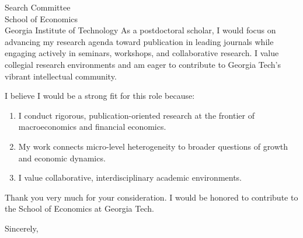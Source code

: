 \documentclass[11pt,letterpaper]{letter}
\begin{document}
\begin{letter}{
Search Committee \\
School of Economics \\
Georgia Institute of Technology
}
As a postdoctoral scholar, I would focus on advancing my research agenda toward publication in leading journals while engaging actively in seminars, workshops, and collaborative research. I value collegial research environments and am eager to contribute to Georgia Tech’s vibrant intellectual community.

I believe I would be a strong fit for this role because:
\begin{enumerate}
    \item I conduct rigorous, publication-oriented research at the frontier of macroeconomics and financial economics.
    \item My work connects micro-level heterogeneity to broader questions of growth and economic dynamics.
    \item I value collaborative, interdisciplinary academic environments.
\end{enumerate}

Thank you very much for your consideration. I would be honored to contribute to the School of Economics at Georgia Tech.

\closing{Sincerely,}

\end{letter}
\end{document}
